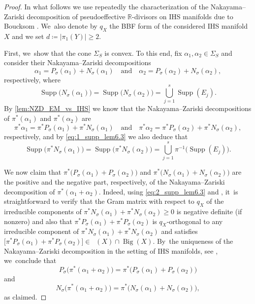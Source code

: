 \documentclass[JEP,XML,SOM,Unicode,published]{cedram}
\theoremstyle{plain}
\theoremstyle{definition}
\newcommand{\R}{\mathbb{R}}
\DeclareMathOperator{\Supp}{Supp}
\DeclareMathOperator{\Movb}{\overline{\mathrm{Mov}}}
\DeclareMathOperator{\BgCn}{\mathrm{Big}}
\begin{document}
\begin{proof}
In what follows we use repeatedly the characterization of the Nakayama--Zariski decomposition of pseudoeffective $\R$\nobreakdash-divisors on IHS manifolds due to Boucksom \cite[Th.\,4.8]{Boucksom04}. We~also denote by $q_X$ the BBF form of the considered IHS manifold $X$ and we set $d \coloneqq | \pi_1(Y) | \geq 2$.

First, we~show that the cone $\Sigma_S$ is convex. To this end, fix $\alpha_1, \alpha_2 \in \Sigma_S$ and consider their Nakayama--Zariski decompositions
\[
\alpha_1 = P_\sigma(\alpha_1) + N_\sigma(\alpha_1) \quad \text{and} \quad \alpha_2 = P_\sigma(\alpha_2) + N_\sigma(\alpha_2),
\]
respectively, where
\begin{equation}
\label{eq:1_supp_lem6.3}
\Supp \bigl(N_{\sigma}(\alpha_1) \bigr) = \Supp \bigl(N_{\sigma}(\alpha_2) \bigr) = \bigcup_{j=1}^s \Supp(E_j).
\end{equation}
By \autoref{lem:NZD_EM_vs_IHS} we know that the Nakayama--Zariski decompositions of $\pi^* (\alpha_1)$ and $\pi^* (\alpha_2)$ are
\[
\pi^* \alpha_1 = \pi^* P_\sigma(\alpha_1) + \pi^* N_\sigma(\alpha_1) \quad \text{and} \quad \pi^* \alpha_2 = \pi^* P_\sigma(\alpha_2) + \pi^* N_\sigma(\alpha_2),
\]
respectively, and by \eqref{eq:1_supp_lem6.3} we also deduce that
\begin{equation}
\label{eq:2_supp_lem6.3}
\Supp \bigl(\pi^* N_{\sigma} (\alpha_1) \bigr) = \Supp \bigl(\pi^* N_{\sigma} (\alpha_2) \bigr) = \bigcup_{j=1}^s \pi^{-1} \bigl(\Supp (E_j) \bigr).
\end{equation}

We now claim that $\pi^* \bigl(P_\sigma(\alpha_1) + P_\sigma(\alpha_2) \bigr)$ and $\pi^* \bigl(N_\sigma(\alpha_1) + N_\sigma(\alpha_2) \bigr)$ are the positive and the negative part, respectively, of the Nakayama--Zariski decomposition of $\pi^*(\alpha_1 + \alpha_2)$. Indeed, using \eqref{eq:2_supp_lem6.3} and \cite[Th.\,4.8]{Boucksom04}, it~is straightforward to verify that the Gram matrix with respect to $q_X$ of the irreducible components of $\pi^*N_\sigma(\alpha_1)+\pi^*N_\sigma(\alpha_2) \geq 0$ is negative definite (if nonzero) and also that $\pi^* P_\sigma(\alpha_1)+\pi^* P_\sigma(\alpha_2)$ is $q_X$-orthogonal to any irreducible component of $\pi^* N_\sigma(\alpha_1)+\pi^*N_\sigma(\alpha_2)$ and satisfies
$\big[\pi^* P_\sigma(\alpha_1)+\pi^* P_\sigma(\alpha_2) \big] \in \Movb(X) \cap \BgCn(X)$. By~the uniqueness of the Nakayama--Zariski decomposition in the setting of IHS manifolds, see \cite[Th.\,4.8]{Boucksom04}, we~conclude that
\begin{equation*}
P_\sigma \bigl(\pi^* (\alpha_1 + \alpha_2) \bigr) = \pi^* \bigl(P_\sigma(\alpha_1) + P_\sigma(\alpha_2) \bigr)
\end{equation*}
and
\begin{equation}
\label{eq:3_Nsigma_lem6.3}
N_\sigma \bigl(\pi^* (\alpha_1 + \alpha_2) \bigr) = \pi^* \bigl(N_\sigma(\alpha_1) + N_\sigma(\alpha_2) \bigr),
\end{equation}
as claimed.


\end{proof}
\end{document}
